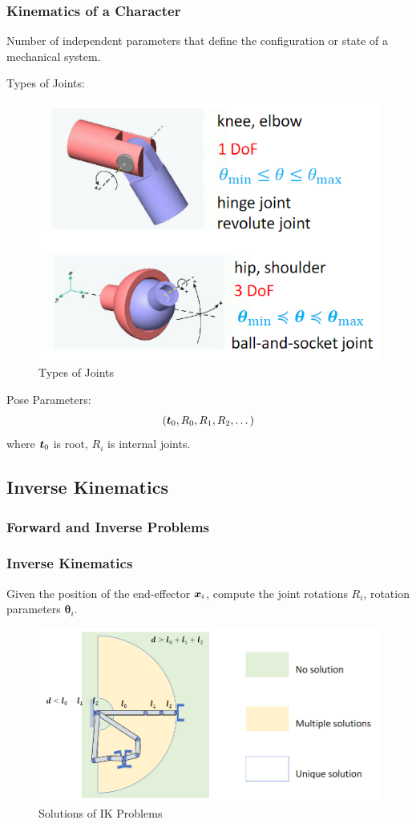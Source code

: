 \subsubsection{Kinematics of a Character}
\begin{definition}
    Number of independent parameters that define the configuration or state of
a mechanical system. 
\end{definition}

Types of Joints:
\begin{figure}[!htb]
    \centering
    \includegraphics[width=0.618\linewidth]{pic/1053/Types of Joints}
    \caption{Types of Joints}
\end{figure}

Pose Parameters: 
\begin{align*}
    ({\bm{t}}_0, R_0, R_1,R_2,\dots)
\end{align*}
where ${\bm{t}}_0$ is root, $R_i$ is internal joints.



\subsection{Inverse Kinematics}

\subsubsection{Forward and Inverse Problems}

\subsubsection{Inverse Kinematics}
Given the position of the end-effector ${\bm{x}}_i$, compute the joint rotations $R_i$, rotation parameters $\bm{\theta}_i$.


\begin{figure}[!htb]
    \centering
    \includegraphics[width=0.618\linewidth]{pic/1053/Solutions of IK Problems}
    \caption{Solutions of IK Problems}
\end{figure}


